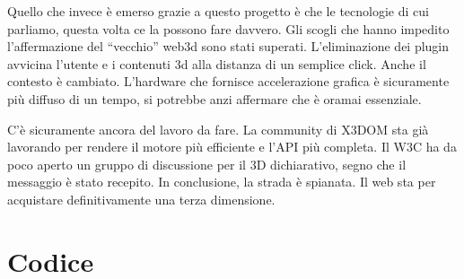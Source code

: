 \documentclass[a4paper,12pt]{report}
\begin{document}
Quello che invece è emerso grazie a questo progetto è che le tecnologie di cui parliamo, questa volta ce la possono fare davvero. Gli scogli che hanno impedito l'affermazione del ``vecchio'' web3d sono stati superati. L'eliminazione dei plugin avvicina l'utente e i contenuti 3d alla distanza di un semplice click. Anche il contesto è cambiato. L'hardware che fornisce accelerazione grafica è sicuramente più diffuso di un tempo, si potrebbe anzi affermare che è oramai essenziale.

C'è sicuramente ancora del lavoro da fare. La community di X3DOM sta già lavorando per rendere il motore più efficiente e l'API più completa. Il W3C ha da poco aperto un gruppo di discussione per il 3D dichiarativo, segno che il messaggio è stato recepito. In conclusione, la strada è spianata. Il web sta per acquistare definitivamente una terza dimensione.
\newpage
{}
\begin{thebibliography}{99}

\end{thebibliography}
\appendix
\linespread{1}
\chapter{Codice}

\def\baselinestretch{0.7}
\def\baselinestretch{1}
\end{document}
